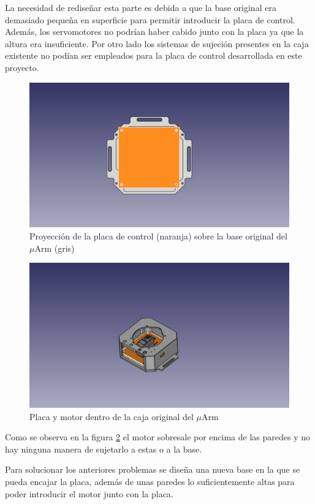  La necesidad de rediseñar esta parte es debida a que la base original era demasiado pequeña en superficie para permitir introducir la placa de control. Además, los servomotores no podrían haber cabido junto con la placa ya que la altura era insuficiente. Por otro lado los sistemas de sujeción presentes en la caja existente no podían ser empleados para la placa de control desarrollada en este proyecto.
 
 \begin{figure}[H]
    \centering
    \includegraphics[width=.9\linewidth]{pictures/PlacaYBase.png}
    \caption{Proyección de la placa de control (naranja) sobre la base original del $\mu$Arm (gris)}
    \label{fig:placa_y_base_antiguas}
\end{figure}


 \begin{figure}[H]
    \centering
    \includegraphics[width=.9\linewidth]{pictures/PlacaMotorYParedes1.png}
    \caption{Placa y motor dentro de la caja original del $\mu$Arm}
    \label{fig:placa_motor_y_paredes1}
\end{figure}

Como se observa en la figura \ref{fig:placa_motor_y_paredes1} el motor sobresale por encima de las paredes y no hay ninguna manera de sujetarlo a estas o a la base.

Para solucionar los anteriores problemas se diseña una nueva base en la que se pueda encajar la placa, además de unas paredes lo suficientemente altas para poder introducir el motor junto con la placa.







